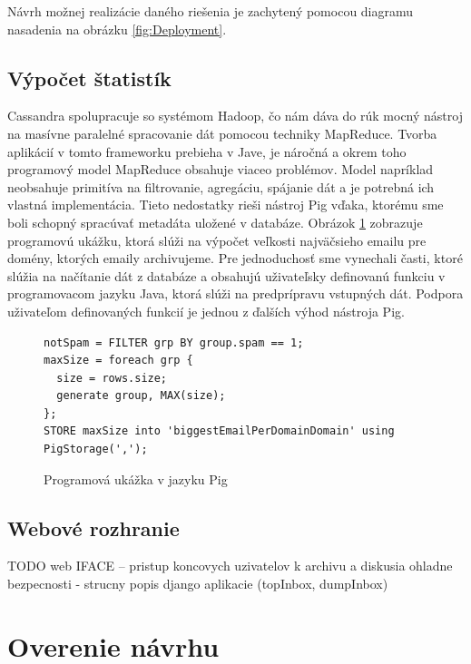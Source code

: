 \documentclass[11pt,twoside,a4paper]{book}
\begin{document}
Návrh možnej realizácie daného riešenia je zachytený pomocou diagramu nasadenia na obrázku \ref{fig:Deployment}.

\subsection{Výpočet štatistík}

Cassandra spolupracuje so systémom Hadoop, čo nám dáva do rúk mocný nástroj na masívne paralelné spracovanie dát pomocou techniky MapReduce. Tvorba aplikácií v tomto frameworku prebieha v Jave, je náročná a okrem toho programový model MapReduce obsahuje viaceo problémov. Model napríklad neobsahuje primitíva na filtrovanie, agregáciu, spájanie dát a je potrebná ich vlastná implementácia. Tieto nedostatky rieši nástroj Pig \cite{???} vďaka, ktorému sme boli schopný spracúvať metadáta uložené v databáze. Obrázok \ref{fig:PigExample} zobrazuje programovú ukážku, ktorá slúži na výpočet veľkosti najväčsieho emailu pre domény, ktorých emaily archivujeme. Pre jednoduchosť sme vynechali časti, ktoré slúžia na načítanie dát z databáze a obsahujú uživateľsky definovanú funkciu v programovacom jazyku Java, ktorá slúži na predprípravu vstupných dát. Podpora uživateľom definovaných funkcií je jednou z ďalších výhod nástroja Pig.

\begin{figure}[h]
\begin{verbatim}
notSpam = FILTER grp BY group.spam == 1;
maxSize = foreach grp {
  size = rows.size;
  generate group, MAX(size);
};
STORE maxSize into 'biggestEmailPerDomainDomain' using PigStorage(',');
\end{verbatim}
 \caption{Programová ukážka v jazyku Pig}
 \label{fig:PigExample}
\end{figure}  



\subsection{Webové rozhranie}
TODO
web IFACE -- pristup koncovych uzivatelov k archivu a diskusia ohladne bezpecnosti - strucny popis django aplikacie (topInbox, dumpInbox)



\section{Overenie návrhu}
\end{document}
